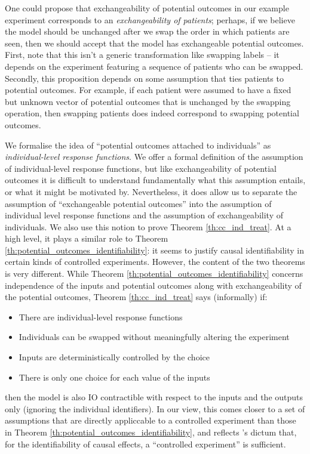 One could propose that exchangeability of potential outcomes in our example experiment corresponds to an \emph{exchangeability of patients}; perhaps, if we believe the model should be unchanged after we swap the order in which patients are seen, then we should accept that the model has exchangeable potential outcomes. First, note that this isn't a generic transformation like swapping labels -- it depends on the experiment featuring a sequence of patients who can be swapped. Secondly, this proposition depends on some assumption that ties patients to potential outcomes. For example, if each patient were assumed to have a fixed but unknown vector of potential outcomes that is unchanged by the swapping operation, then swapping patients does indeed correspond to swapping potential outcomes.

We formalise the idea of ``potential outcomes attached to individuals'' as \emph{individual-level response functions}. We offer a formal definition of the assumption of individual-level response functions, but like exchangeability of potential outcomes it is difficult to understand fundamentally what this assumption entails, or what it might be motivated by. Nevertheless, it does allow us to separate the assumption of ``exchangeable potential outcomes'' into the assumption of individual level response functions and the assumption of exchangeability of individuals. We also use this notion to prove Theorem \ref{th:cc_ind_treat}. At a high level, it plays a similar role to Theorem \ref{th:potential_outcomes_identifiability}: it seems to justify causal identifiability in certain kinds of controlled experiments. However, the content of the two theorems is very different. While Theorem \ref{th:potential_outcomes_identifiability} concerns independence of the inputs and potential outcomes along with exchangeability of the potential outcomes, Theorem \ref{th:cc_ind_treat} says (informally) if:
\begin{itemize}
    \item There are individual-level response functions
    \item Individuals can be swapped without meaningfully altering the experiment
    \item Inputs are deterministically controlled by the choice
    \item There is only one choice for each value of the inputs
\end{itemize}
then the model is also IO contractible with respect to the inputs and the outputs only (ignoring the individual identifiers). In our view, this comes closer to a set of assumptions that are directly appliccable to a controlled experiment than those in Theorem \ref{th:potential_outcomes_identifiability}, and reflects \citet{kasy_why_2016}'s dictum that, for the identifiability of causal effects, a ``controlled experiment'' is sufficient.

